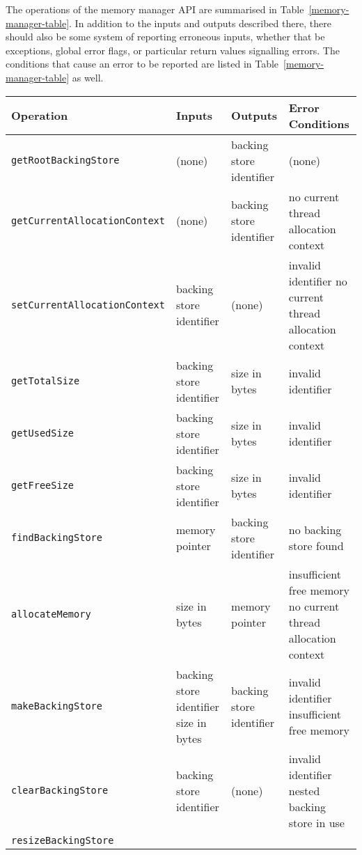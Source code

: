 The operations of the memory manager API are summarised in
Table~\ref{memory-manager-table}.
In addition to the inputs and outputs described there, there should
also be some system of reporting erroneous inputs, whether that be
exceptions, global error flags, or particular return values signalling
errors.
The conditions that cause an error to be reported are listed in
Table~\ref{memory-manager-table} as well.

\begin{table*}[ht]
  \centering
  \footnotesize
  \begin{tabular}{|l|p{3.2cm}|p{3.2cm}|p{5cm}|}
    Operation & Inputs & Outputs & Error Conditions \\
    \hline
    \texttt{getRootBackingStore} &
    (none) &
    backing store identifier &
    (none)
    \\\texttt{getCurrentAllocationContext} &
    (none) &
    backing store identifier &
    no current thread allocation context
    \\\texttt{setCurrentAllocationContext} &
    backing store identifier &
    (none) &
    invalid identifier \newline
    no current thread allocation context
    \\\texttt{getTotalSize} &
    backing store identifier &
    size in bytes &
    invalid identifier
    \\\texttt{getUsedSize} &
    backing store identifier &
    size in bytes &
    invalid identifier
    \\\texttt{getFreeSize} &
    backing store identifier &
    size in bytes &
    invalid identifier
    \\\texttt{findBackingStore} &
    memory pointer &
    backing store identifier &
    no backing store found
    \\\texttt{allocateMemory} &
    size in bytes &
    memory pointer &
    insufficient free memory \newline
    no current thread allocation context
    \\\texttt{makeBackingStore} &
    backing store identifier \newline
    size in bytes & 
    backing store identifier &
    invalid identifier \newline
    insufficient free memory
    \\\texttt{clearBackingStore} &
    backing store identifier &
    (none) &
    invalid identifier
    nested backing store in use
    \\\texttt{resizeBackingStore} &

\end{tabular}
\end{table*}

